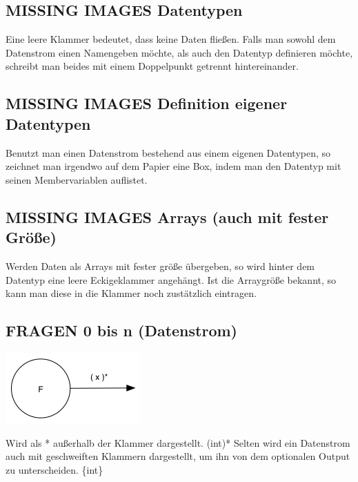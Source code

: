 \documentclass[11pt]{article}
\begin{document}
\subsection{{\bfseries\sffamily MISSING IMAGES} Datentypen}
\label{sec:orgheadline14}

Eine leere Klammer bedeutet, dass keine Daten fließen.
Falls man sowohl dem Datenstrom einen Namengeben möchte, als auch den Datentyp definieren möchte, schreibt man beides mit einem
Doppelpunkt getrennt hintereinander.
\subsection{{\bfseries\sffamily MISSING IMAGES} Definition eigener Datentypen}
\label{sec:orgheadline15}
Benutzt man einen Datenstrom bestehend aus einem eigenen Datentypen, so zeichnet man irgendwo auf dem Papier eine Box,
indem man den Datentyp mit seinen Membervariablen auflistet.

\subsection{{\bfseries\sffamily MISSING IMAGES} Arrays (auch mit fester Größe)}
\label{sec:orgheadline16}
Werden Daten als Arrays mit fester größe übergeben, so wird hinter dem Datentyp eine leere Eckigeklammer angehängt.
Ist die Arraygröße bekannt, so kann man diese in die Klammer noch zustätzlich eintragen.
\subsection{{\bfseries\sffamily FRAGEN} 0 bis n (Datenstrom)}
\label{sec:orgheadline17}

\includegraphics[width=.9\linewidth]{./img/diagram0n.png}

Wird als * außerhalb der Klammer dargestellt.
(int)*
Selten wird ein Datenstrom auch mit geschweiften Klammern dargestellt, um ihn von dem optionalen Output zu unterscheiden.
\{int\}
\end{document}

